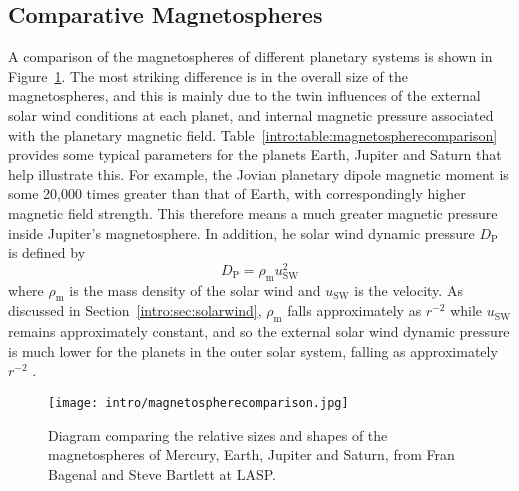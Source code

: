 \subsection{Comparative Magnetospheres}\label{intro:sec:comparativemagnetospheres}
A comparison of the magnetospheres of different planetary systems is shown in Figure~\ref{intro:fig:magnetospherecomparison}. The most striking difference is in the overall size of the magnetospheres, and this is mainly due to the twin influences of the external solar wind conditions at each planet, and internal magnetic pressure associated with the planetary magnetic field. Table~\ref{intro:table:magnetospherecomparison} provides some typical parameters for the planets Earth, Jupiter and Saturn that help illustrate this. For example, the Jovian planetary dipole magnetic moment is some 20,000 times greater than that of Earth, with correspondingly higher magnetic field strength. This therefore means a much greater magnetic pressure inside Jupiter's magnetosphere. In addition, he solar wind dynamic pressure $D_\mathrm{P}$ is defined by 
\begin{equation}\label{intro:eq:dp}
D_\mathrm{P} = \rho_\mathrm{m}u_\mathrm{SW}^2
\end{equation}
where $\rho_\mathrm{m}$ is the mass density of the solar wind and $u_\mathrm{SW}$ is the velocity. As discussed in Section~\ref{intro:sec:solarwind}, $\rho_\mathrm{m}$ falls approximately as $r^{-2}$ while $u_\mathrm{SW}$ remains approximately constant, and so the external solar wind dynamic pressure is much lower for the planets in the outer solar system, falling as approximately $r^{-2}$ .
\begin{figure}
\centering
\noindent\texttt{[image: intro/magnetospherecomparison.jpg]}
\caption[Diagram of Mercury, Earth, Jupiter and Saturn magnetospheres.]{Diagram comparing the relative sizes and shapes of the magnetospheres of Mercury, Earth, Jupiter and Saturn, from Fran Bagenal and Steve Bartlett at LASP.}
\label{intro:fig:magnetospherecomparison}
\end{figure}
